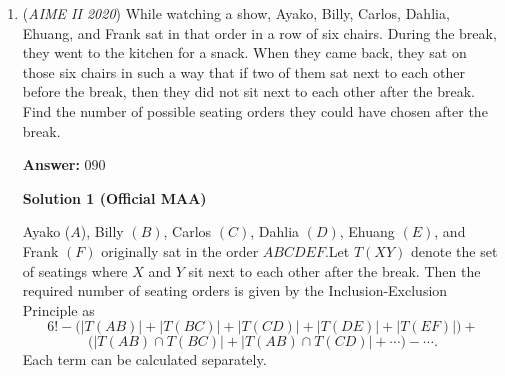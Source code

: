 \begin{enumerate}
 



\textbf{Solution 2 (Same idea, easier to see)}

Starting from $f_1(x)=|x-1|$, we can track the solutions, the number of solutions, and their sum: 

 
 \[\begin{array}{c|c|c|c} n&Solutions&number&sum\\  1&1&1&1\\   2&1,3&2&4\\    3&0,2,4,6&4&12\\ 4&-2,0,2...10&7&28\\ 5&-5,-3,-1...15&11&55\\ \end{array}\]

 It is clear that the solutions form arithmetic sequences with a difference of 2, and the negative solutions cancel out all but $n$ of the $1+\frac{n(n-1)}{2}$ solutions. Thus, the sum of the solutions is $n \cdot [1+\frac{n(n-1)}{2}]$, which is a cubic function.(Side Note: Gergor-Newton Interpolation Formula is applicable here)

 $n \cdot [1+\frac{n(n-1)}{2}]>500,000$

 Multiplying both sides by $2$, 

 $n \cdot [2+n(n-1)]>1,000,000$

 1 million is $10^6=100^3$, so the solution should be close to $100$.

 100 is slightly too small, so $\boxed{101}$ works. 

 


	\item (\textit{AIME II 2020}) While watching a show, Ayako, Billy, Carlos, Dahlia, Ehuang, and Frank sat in that order in a row of six chairs. During the break, they went to the kitchen for a snack. When they came back, they sat on those six chairs in such a way that if two of them sat next to each other before the break, then they did not sit next to each other after the break. Find the number of possible seating orders they could have chosen after the break.


 
 \textbf{Answer: }090



\textbf{Solution 1 (Official MAA)}

Ayako ($A$), Billy $(B)$, Carlos $(C)$, Dahlia $(D)$, Ehuang $(E)$, and Frank $(F)$ originally sat in the order $ABCDEF$.Let $T(XY)$ denote the set of seatings where $X$ and $Y$ sit next to each other after the break. Then the required number of seating orders is given by the Inclusion-Exclusion Principle as
 \[6!-\big(|T(AB)|+|T(BC)|+|T(CD)|+|T(DE)|+|T(EF)|\big)+\]
 \[\big(|T(AB)\cap T(BC)|+|T(AB)\cap T(CD)|+\cdots\big) - \cdots.\]Each term can be calculated separately.


\end{enumerate}

